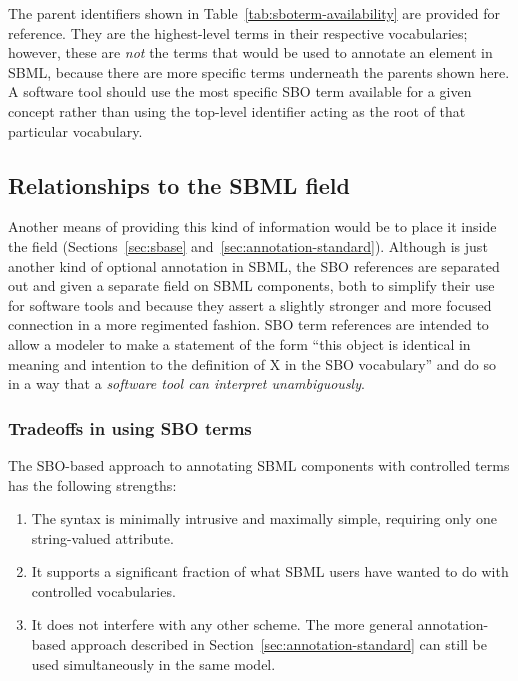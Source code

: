 The parent identifiers shown in
Table~\ref{tab:sboterm-availability} are provided for reference.
They are the highest-level terms in their respective vocabularies;
however, these are \emph{not} the terms that would be used to
annotate an element in SBML, because there are more specific terms
underneath the parents shown here.  A software tool should use the
most specific SBO term available for a given concept rather than
using the top-level identifier acting as the root of that
particular vocabulary.





\subsection{Relationships to the SBML  field}

Another means of providing this kind of information would be to
place it inside the  field
(Sections~\ref{sec:sbase} and~\ref{sec:annotation-standard}).
Although  is just another kind of optional
annotation in SBML, the SBO references are separated out and given
a separate field on SBML components, both to simplify their use
for software tools and because they assert a slightly stronger and
more focused connection in a more regimented fashion.  SBO term
references are intended to allow a modeler to make a statement of
the form ``this object is identical in meaning and intention to
the definition of X in the SBO vocabulary'' and do so in a way
that a \emph{software tool can interpret unambiguously}.


\subsubsection{Tradeoffs in using SBO terms}

The SBO-based approach to annotating SBML components with
controlled terms has the following strengths:
\begin{enumerate}

\item The syntax is minimally intrusive and maximally simple,
  requiring only one string-valued attribute.

\item It supports a significant fraction of what SBML users have wanted
  to do with controlled vocabularies.

\item It does not interfere with any other scheme.  The more
  general annotation-based approach described in
  Section~\ref{sec:annotation-standard} can still be used
  simultaneously in the same model.

\end{enumerate}

